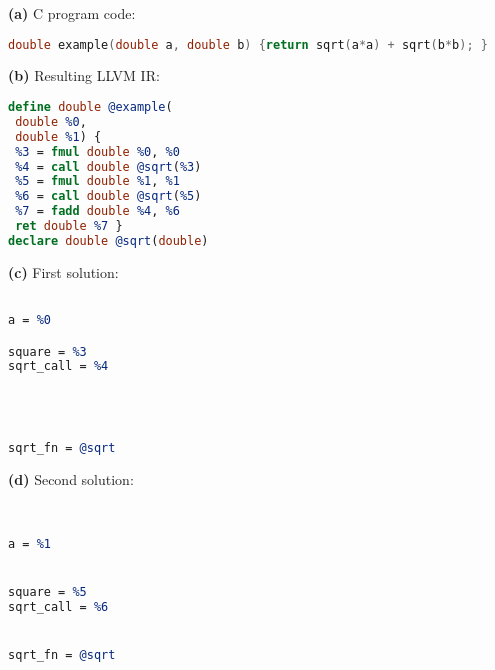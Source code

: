 \centering
\begin{minipage}[t]{\textwidth}
\centering
\begin{minipage}[t]{\textwidth}
\centering
{\bf(a)} C program code:
\begin{lstlisting}[numbers=none,framexleftmargin=0pt,xleftmargin=0pt,language=C,basicstyle=\small\ttfamily]
 double example(double a, double b) {return sqrt(a*a) + sqrt(b*b); }
\end{lstlisting}
\end{minipage}
\begin{minipage}[t]{7.1cm}
\centering
{\bf(b)} Resulting LLVM IR:
\begin{lstlisting}[language={LLVM}]
define double @example(    
 double %0,                
 double %1) {              
 %3 = fmul double %0, %0   
 %4 = call double @sqrt(%3)
 %5 = fmul double %1, %1   
 %6 = call double @sqrt(%5)
 %7 = fadd double %4, %6   
 ret double %7 }
declare double @sqrt(double)      
\end{lstlisting}
\end{minipage}
\hfill
\begin{minipage}[t]{3.5cm}
\centering
{\bf(c)} First solution:
\begin{lstlisting}[numbers=none,framexleftmargin=0pt,xleftmargin=0pt,language=LLVM]

a = %0

square = %3
sqrt_call = %4 




sqrt_fn = @sqrt
\end{lstlisting}
\end{minipage}
\hfill
\begin{minipage}[t]{3.5cm}
\centering
{\bf(d)} Second solution:
\begin{lstlisting}[numbers=none,framexleftmargin=0pt,xleftmargin=0pt,language=LLVM]


a = %1


square = %5
sqrt_call = %6


sqrt_fn = @sqrt
\end{lstlisting}
\end{minipage}
\end{minipage}

